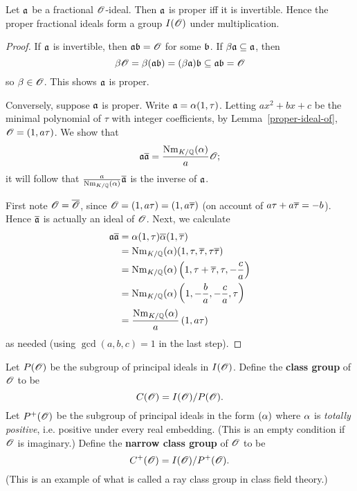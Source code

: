 \begin{pr}
Let $\mathfrak{a}$ be a fractional $\mathscr{O}$-ideal. Then $\mathfrak{a}$ is proper iff it is invertible. Hence the proper fractional ideals form a group $I(\mathscr{O})$ under multiplication.
\end{pr}
\begin{proof}
If $\mathfrak{a}$ is invertible, then $\mathfrak{a}\mathfrak{b}=\mathscr{O}$ for some $\mathfrak{b}$. If $\beta\mathfrak{a}\subseteq \mathfrak{a}$, then
\[
\beta\mathscr{O}=
\beta (\mathfrak{a}\mathfrak{b})=(\beta\mathfrak{a})\mathfrak{b}\subseteq \mathfrak{a}\mathfrak{b}=\mathscr{O}
\]
so $\beta\in \mathscr{O}$. This shows $\mathfrak{a}$ is proper.

Conversely, suppose $\mathfrak{a}$ is proper. Write $\mathfrak{a}=\alpha(1,\tau)$. Letting $ax^2+bx+c$ be the minimal polynomial of $\tau$ with integer coefficients, by Lemma~\ref{proper-ideal-of}, $\mathscr{O}=(1,a\tau)$. We show that
\[
\mathfrak{a}\overline{\mathfrak{a}}=\frac{\operatorname{Nm}_{K/\mathbb{Q}}(\alpha)}{a}\mathscr{O};
\]
it will follow that $\frac{a}{\operatorname{Nm}_{K/\mathbb{Q}}(\alpha)}\overline{\mathfrak{a}}$ is the inverse of $\mathfrak{a}$.

First note %
$\mathscr{O}=\overline{\mathscr{O}}$, since $\mathscr{O}=(1,a\tau)=(1,a\overline{\tau})$ (on account of $a\tau+a\overline{\tau}=-b$).  Hence $\overline{\mathfrak{a}}$ is actually an ideal of $\mathscr{O}$. Next, we calculate
\begin{align*}
\mathfrak{a}\overline{\mathfrak{a}}&=\alpha(1,\tau)\overline{\alpha}(1,\overline{\tau})\\
&=\operatorname{Nm}_{K/\mathbb{Q}}(\alpha)(1,\tau,\overline{\tau}, \tau\overline{\tau})\\
&=\operatorname{Nm}_{K/\mathbb{Q}}(\alpha)\left( {1, \tau+\overline{\tau}, \tau,-\frac ca} \right)\\
&=\operatorname{Nm}_{K/\mathbb{Q}}(\alpha)\left( {1,-\frac ba, -\frac ca,\tau} \right)\\
&=\frac{\operatorname{Nm}_{K/\mathbb{Q}}(\alpha)}{a}\left( {1,a\tau} \right)
\end{align*}
as needed (using $\gcd(a,b,c)=1$ in the last step).
\end{proof}
Let $P(\mathscr{O})$ be the subgroup of principal ideals in $I(\mathscr{O})$. Define the \textbf{class group} of $\mathscr{O}$ to be
\[
C(\mathscr{O})=I(\mathscr{O})/P(\mathscr{O}).
\]
Let $P^+(\mathscr{O})$ be the subgroup of principal ideals in the form $(\alpha)$ where $\alpha$ is {\it totally positive}, i.e. positive under every real embedding. (This is an empty condition if $\mathscr{O}$ is imaginary.)
Define the \textbf{narrow class group} of $\mathscr{O}$ to be
\[
C^+(\mathscr{O})=I(\mathscr{O})/P^+(\mathscr{O}).
\]
(This is an example of what is called a ray class group in class field theory.)
